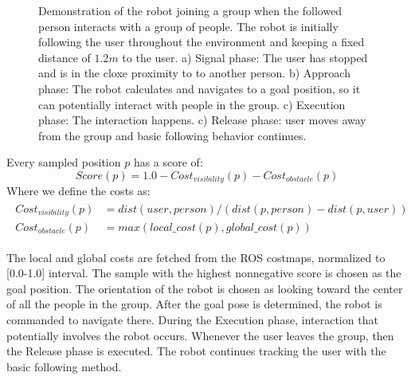 \begin{figure}[ht!]
{        }%
    \caption{Demonstration of the robot joining a group when the followed person interacts with a group of people. The robot is initially following the user throughout the environment and keeping a fixed distance of $1.2m$ to the user. a) Signal phase: The user has stopped and is in the cloxe proximity to to another person. b) Approach phase: The robot calculates and navigates to a goal position, so it can potentially interact with people in the group. c) Execution phase: The interaction happens. c) Release phase: user moves away from the group and basic following behavior continues.}
   \label{fig:situtation_aware_joining_group}
\end{figure}

Every sampled position $p$ has a score of:
\[
Score(p) = 1.0 - Cost_{visibility}(p) - Cost_{obstacle}(p)
\]
Where we define the costs as:
\begin{align} 
\begin{split}
Cost_{visibility}(p)&=dist(user,person)/(dist(p,person)-dist(p,user)) \\
Cost_{obstacle}(p)&=max(local\_cost(p),global\_cost(p))
\end{split}
\end{align}

The local and global costs are fetched from the ROS costmaps, normalized to [0.0-1.0] interval. The sample with the highest nonnegative score is chosen as the goal position. The orientation of the robot is chosen as looking toward the center of all the people in the group. After the goal pose is determined, the robot is commanded to navigate there. During the Execution phase, interaction that potentially involves the robot occurs. Whenever the user leaves the group, then the Release phase is executed. The robot continues tracking the user with the basic following method.

